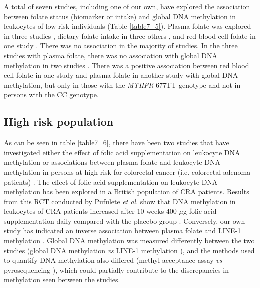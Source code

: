 \noindent A total of seven studies, including one of our own, have explored the association between folate status (biomarker or intake) and global DNA methylation in leukocytes of low risk individuals (Table \ref{table7_5}). Plasma folate was explored in three studies \cite{c76,c77,c78}, dietary folate intake in three others \cite{c79,c710,c711}, and red blood cell folate in one study \cite{c712}. There was no association in the majority of studies. In the three studies with plasma folate, there was no association with global DNA methylation in two studies \cite{c77,c78}. There was a positive association between red blood cell folate \cite{c712} in one study and plasma folate \cite{c76} in another study with global DNA methylation, but only in those with the \emph{MTHFR} 677TT genotype and not in persons with the CC genotype.

\subsection{High risk population} %
\noindent As can be seen in table \ref{table7_6}, there have been two studies that have investigated either the effect of folic acid supplementation on leukocyte DNA methylation \cite{c713} or associations between plasma folate and leukocyte DNA methylation in persons at high risk for colorectal cancer (i.e. colorectal adenoma patients) \cite{c714}. The effect of folic acid supplementation on leukocyte DNA methylation has been explored in a British population of CRA patients. Results from this RCT conducted by Pufulete \emph{et al}. show that DNA methylation in leukocytes of CRA patients increased after 10 weeks 400 $\mu$g folic acid supplementation daily compared with the placebo group \cite{c713}. Conversely, our own study has indicated an inverse association between plasma folate and LINE-1 methylation \cite{c714}. Global DNA methylation was measured differently between the two studies (global DNA methylation \cite{c713} \emph{vs} LINE-1 methylation \cite{c714}), and the methods used to quantify DNA methylation also differed (methyl acceptance assay \cite{c713} \emph{vs} pyrosequencing \cite{c714}), which could partially contribute to the discrepancies in methylation seen between the studies.

